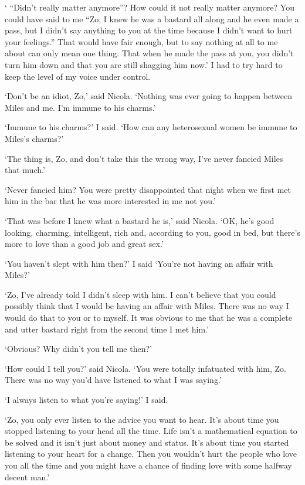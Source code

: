 ` ``Didn't really matter anymore''? How could it not really matter anymore? You could have said to me ``Zo, I knew he was a bastard all along and he even made a pass, but I didn't say anything to you at the time because I didn't want to hurt your feelings.'' That would have fair enough, but to say nothing at all to me about can only mean one thing. That when he made the pass at you, you didn't turn him down and that you are still shagging him now.' I had to try hard to keep the level of my voice under control.

`Don't be an idiot, Zo,' said Nicola. `Nothing was ever going to happen between Miles and me. I'm immune to his charms.'

`Immune to his charms?' I said. `How can any heterosexual women be immune to Miles's charms?'

`The thing is, Zo, and don't take this the wrong way, I've never fancied Miles that much.'

`Never fancied him? You were pretty disappointed that night when we first met him in the bar that
he was more interested in me not you.'

`That was before I knew what a bastard he is,' said Nicola. `OK, he's good looking, charming, intelligent, rich and, according to you, good in bed, but there's more to love than a good job and great sex.'

`You haven't slept with him then?' I said `You're not having an affair with Miles?'

`Zo, I've already told I didn't sleep with him. I can't believe that you could possibly think that I would be having an affair with Miles. There was no way I would do that to you or to myself. It was obvious to me that
he was a complete and utter bastard right from the second time I met him.'

`Obvious? Why didn't you tell me then?'

`How could I tell you?' said Nicola. `You were totally infatuated with him, Zo. There
was no way you'd have listened to what I was saying.'

`I always listen to what you're saying!' I said.

`Zo, you only ever listen to the advice you want to hear. It's about time you stopped listening to your head all the time. Life isn't a mathematical equation to be solved and it isn't just about money and status. It's about time you started listening to your heart for a change. Then you wouldn't hurt the people who love you all the time and you might have a chance of finding love with some halfway decent man.'

